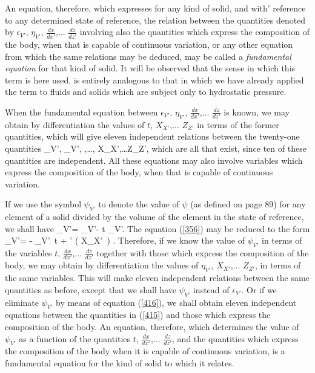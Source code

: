\documentclass[12pt]{article}
\begin{document}
{An equation, therefore, which expresses for any kind of solid, and with' reference to any determined state of reference, the relation between the quantities denoted by $\epsilon_{V'}$, $\eta_{V'}$, $\frac{dx}{dx'}$,... $\frac{dz}{dz'}$ involving also the quantities which express the composition of the body, when that is capable of continuous variation, or any other equation from which the same relations may be deduced, may be called a \textit{fundamental equation} for that kind of solid. It will be observed that the sense in which this term is here used, is entirely analogous to that in which we have already applied the term to fluids and solids which are subject only to hydrostatic pressure.


When the fundamental equation between $\epsilon_{V'}$, $\eta_{V'}$, $\frac{dx}{dx'}$,... $\frac{dz}{dz'}$ is known, we may obtain by differentiation the values of $t$, $X_{X'}$,... $Z_{Z'}$ in terms of the former quantities, which will give eleven independent relations between the twenty-one quantities
\eqs \epsilon_{V'}, \eta_{V'}, ,\dots {}, X_{X'},\dots Z_{Z'},  \label{415}\eqe
which are all that exist, since ten of these quantities are independent. All these equations may also involve variables which express the composition of the body, when that is capable of continuous variation. 


If we use the symbol $\psi_{V'}$ to denote the value of $\psi$ (as defined on page 89) for any element of a solid divided by the volume of the element in the state of reference, we shall have
\eqs \psi_{V'}= \epsilon_{V'}- t \eta_{V'}.   \label{416}\eqe
The equation (\ref{356}) may be reduced to the form
\eqs \delta \psi_{V'}= - \eta_{V'}\, \delta t + 
\sum \sum\nolimits' \left( X_{X'} \,\delta {}\right) .  \label{417}\eqe
Therefore, if we know the value of $\psi_{V'}$ in terms of the variables $t$, $\frac{dx}{dx'}$,... $\frac{dz}{dz'}$ together with those which express the composition of the body, we may obtain by differentiation the values of $\eta_{V'}$, $X_{X'}$,... $Z_{Z'}$, in terms of the same variables. This will make eleven independent relations between the same quantities as before, except that we shall have $\psi_{V'}$ instead of $\epsilon_{V'}$. Or if we eliminate $\psi_{V'}$ by means of equation (\ref{416}), we shall obtain eleven independent equations between the quantities in (\ref{415}) and those which express the composition of the body. An equation, therefore, which determines the value of $\psi_{V'}$ as a function of the quantities $t$, $\frac{dx}{dx'}$,... $\frac{dz}{dz'}$, and the quantities which express the composition of the body when it is capable of continuous variation, is a fundamental equation for the kind of solid to which it relates.


}
\end{document}

